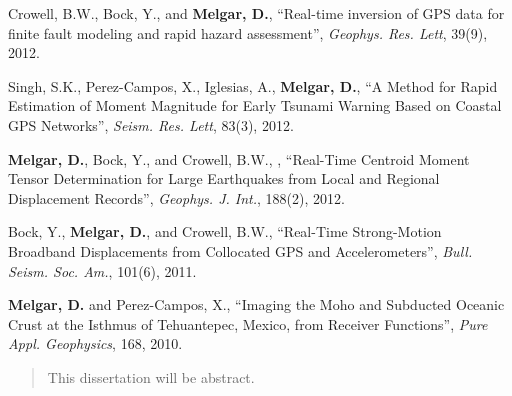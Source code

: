 \begin{frontmatter}
\begin{vitapage}
\begin{publications}
\item Crowell, B.W., Bock, Y., and \textbf{Melgar, D.}, ``Real-time inversion of GPS data for finite fault modeling and rapid hazard assessment'', \emph{Geophys. Res. Lett}, 39(9), 2012.
\item Singh, S.K., Perez-Campos, X., Iglesias, A., \textbf{Melgar, D.}, ``A Method for Rapid Estimation of Moment Magnitude for Early Tsunami Warning Based on Coastal GPS Networks'', \emph{Seism. Res. Lett}, 83(3), 2012.
\item \textbf{Melgar, D.}, Bock, Y., and Crowell, B.W., , ``Real-Time Centroid Moment Tensor Determination for Large Earthquakes from Local and Regional Displacement Records'', \emph{Geophys. J. Int.}, 188(2), 2012.
\item Bock, Y., \textbf{Melgar, D.}, and Crowell, B.W., ``Real-Time Strong-Motion Broadband Displacements from Collocated GPS and Accelerometers'', \emph{Bull. Seism. Soc. Am.}, 101(6), 2011.
\item \textbf{Melgar, D.} and Perez-Campos, X., ``Imaging the Moho and Subducted Oceanic Crust at the Isthmus of Tehuantepec, Mexico, from Receiver Functions'', \emph{Pure Appl. Geophysics}, 168, 2010.

\end{publications}
\end{vitapage}


%
%
\begin{abstract}
  This dissertation will be abstract. 
\end{abstract}


\end{frontmatter}
